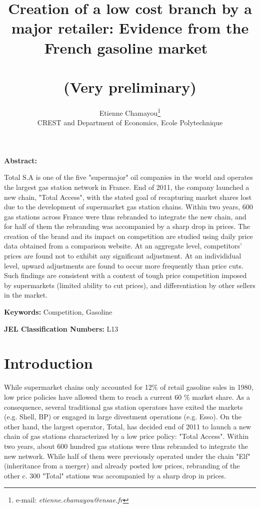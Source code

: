 \documentclass[11pt]{article}
\begin{document}
\title{Creation of a low cost branch by a major retailer: Evidence from the French gasoline market\ \\ \ \\(Very preliminary)}
\author{Etienne Chamayou\thanks{e-mail:
\textit{etienne.chamayou@ensae.fr}}\medskip\\{\normalsize CREST and Department of Economics, Ecole Polytechnique }}
\maketitle

\sloppy%

\onehalfspacing

\textbf{Abstract:}

Total S.A is one of the five "supermajor" oil companies in the world and operates the largest gas station network in France. End of 2011, the company launched a new chain, "Total Access", with the stated goal of recapturing market shares lost due to the development of supermarket gas station chains. Within two years, 600 gas stations across France were thus rebranded to integrate the new chain, and for half of them the rebranding was accompanied by a sharp drop in prices. The creation of the brand and its impact on competition are studied using daily price data obtained from a comparison website. At an aggregate level, competitors' prices are found not to exhibit any significant adjustment. At an individidual level, upward adjustments are found to occur more frequently than price cuts. Such findings are consistent with a context of tough price competition imposed by supermarkets (limited ability to cut prices), and differentiation by other sellers in the market.

\strut

\textbf{Keywords:} Competition, Gasoline

\strut

\textbf{JEL Classification Numbers:} L13

\pagebreak%

\section{Introduction}

While supermarket chains only accounted for 12\% of retail gasoline sales in 1980, low price policies have allowed them to reach a current 60 \% market share. As a consequence, several traditional gas station operators have exited the markets (e.g. Shell, BP) or engaged in large divestment operations (e.g. Esso). On the other hand, the largest operator, Total, has decided end of 2011 to launch a new chain of gas stations characterized by a low price policy: "Total Access". Within two years, about 600 hundred gas stations were thus rebranded to integrate the new network. While half of them were previously operated under the chain "Elf" (inheritance from a merger) and already posted low prices, rebranding of the other c. 300 "Total" stations was accompanied by a sharp drop in prices.
\end{document}
